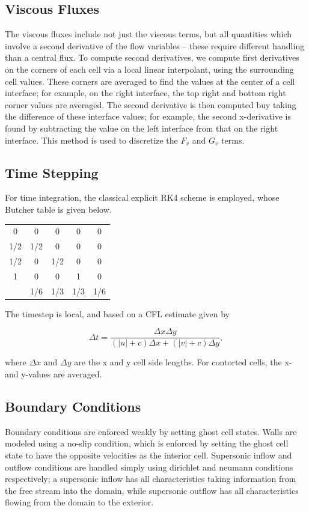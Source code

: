 \documentclass{article}
\begin{document}
\subsection{Viscous Fluxes}
The viscous fluxes include not just the viscous terms, but all quantities which involve a second derivative of the flow variables -- these require different handling than a central flux. To compute second derivatives, we compute first derivatives on the corners of each cell via a local linear interpolant, using the surrounding cell values. These corners are averaged to find the values at the center of a cell interface; for example, on the right interface, the top right and bottom right corner values are averaged. The second derivative is then computed buy taking the difference of these interface values; for example, the second x-derivative is found by subtracting the value on the left interface from that on the right interface. This method is used to discretize the $F_v$ and $G_v$ terms.

\subsection{Time Stepping}
For time integration, the classical explicit RK4 scheme is employed, whose Butcher table is given below.

\begin{table} [!ht]
\centering
\begin{tabular}{c|cccc}
  0 & 0   &   0 &   0 &   0 \\
1/2 & 1/2 &   0 &   0 &   0 \\
1/2 & 0   & 1/2 &   0 &   0 \\
  1 & 0   &   0 &   1 &   0 \\
\hline
    & 1/6 & 1/3 & 1/3 & 1/6
\end{tabular}
\end{table}

The timestep is local, and based on a CFL estimate given by

\begin{equation}
\Delta t = \frac{\Delta x \Delta y}{(|u|+c)\Delta x + (|v|+c)\Delta y},
\end{equation}

where $\Delta x$ and $\Delta y$ are the x and y cell side lengths. For contorted cells, the x- and y-values are averaged.

\subsection{Boundary Conditions}
Boundary conditions are enforced weakly by setting ghost cell states. Walls are modeled using a no-slip condition, which is enforced by setting the ghost cell state to have the opposite velocities as the interior cell. Supersonic inflow and outflow conditions are handled simply using dirichlet and neumann conditions respectively; a supersonic inflow has all characteristics taking information from the free stream into the domain, while supersonic outflow has all characteristics flowing from the domain to the exterior.
\end{document}
